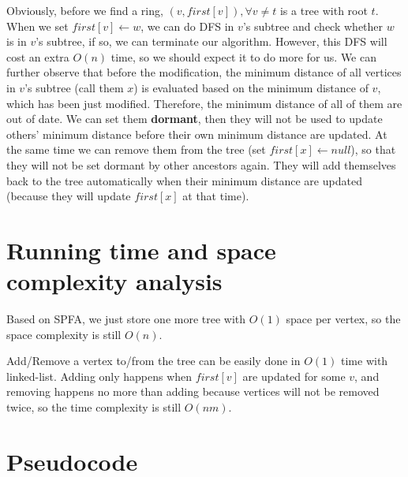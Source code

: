 \documentclass{article}
\begin{document}
Obviously, before we find a ring, $(v, first[v]),\forall v\not=t$ is a tree with root $t$. When we set $first[v]\leftarrow w$, we can do DFS in $v$'s subtree and check whether $w$ is in $v$'s subtree, if so, we can terminate our algorithm. However, this DFS will cost an extra $O(n)$ time, so we should expect it to do more for us. We can further observe that before the modification, the minimum distance of all vertices in $v$'s subtree (call them $x$) is evaluated based on the minimum distance of $v$, which has been just modified. Therefore, the minimum distance of all of them are out of date. We can set them \textbf{dormant}, then they will not be used to update others' minimum distance before their own minimum distance are updated. At the same time we can remove them from the tree (set $first[x]\leftarrow null$), so that they will not be set dormant by other ancestors again. They will add themselves back to the tree automatically when their minimum distance are updated (because they will update $first[x]$ at that time).

\section{Running time and space complexity analysis}

Based on SPFA, we just store one more tree with $O(1)$ space per vertex, so the space complexity is still $O(n)$.

Add/Remove a vertex to/from the tree can be easily done in $O(1)$ time with linked-list. Adding only happens when $first[v]$ are updated for some $v$, and removing happens no more than adding because vertices will not be removed twice, so the time complexity is still $O(nm)$.

\newpage

\section{Pseudocode}
\end{document}

